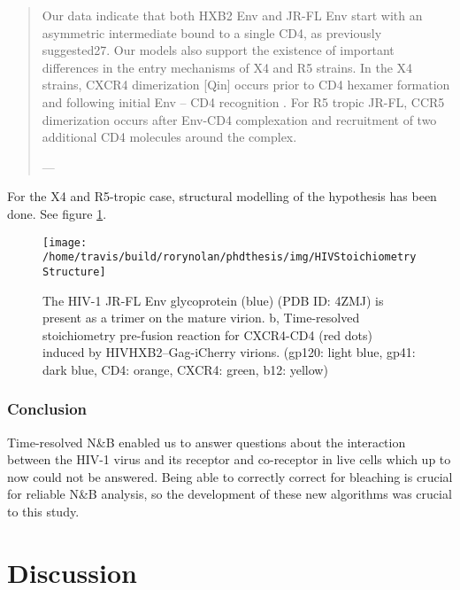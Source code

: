 \documentclass[12pt,]{book}
\theoremstyle{definition}
\theoremstyle{definition}
\theoremstyle{definition}
\theoremstyle{remark}
\begin{document}
\begin{quote}
Our data indicate that both HXB2 Env and JR-FL Env start with an
asymmetric intermediate bound to a single CD4, as previously
suggested27. Our models also support the existence of important
differences in the entry mechanisms of X4 and R5 strains. In the X4
strains, CXCR4 dimerization \citep{Tan} {[}Qin{]} occurs prior to CD4
hexamer formation and following initial Env -- CD4 recognition
\citep{Liu}. For R5 tropic JR-FL, CCR5 dimerization \citep{Qin} occurs
after Env-CD4 complexation and recruitment of two additional CD4
molecules \citep{Wu} around the complex.

--- \citet{HIVstoichiometry}
\end{quote}

For the X4 and R5-tropic case, structural modelling of the hypothesis
has been done. See figure \ref{fig:HIVStoichiometryStructure}.







\begin{figure}

\texttt{[image: /home/travis/build/rorynolan/phdthesis/img/HIVStoichiometryStructure]} \hfill{}

\caption{The HIV-1 JR-FL Env glycoprotein
(blue) (PDB ID: 4ZMJ) is present as a trimer on the mature virion. b,
Time-resolved stoichiometry pre-fusion reaction for CXCR4-CD4 (red dots)
induced by HIVHXB2--Gag-iCherry virions. (gp120: light blue, gp41: dark
blue, CD4: orange, CXCR4: green, b12: yellow)}\label{fig:HIVStoichiometryStructure}
\end{figure}

\subsection{Conclusion}\label{conclusion}

Time-resolved N\&B enabled us to answer questions about the interaction
between the HIV-1 virus and its receptor and co-receptor in live cells
which up to now could not be answered. Being able to correctly correct
for bleaching is crucial for reliable N\&B analysis, so the development
of these new algorithms was crucial to this study.

\chapter{Discussion}\label{discussion}
\end{document}
